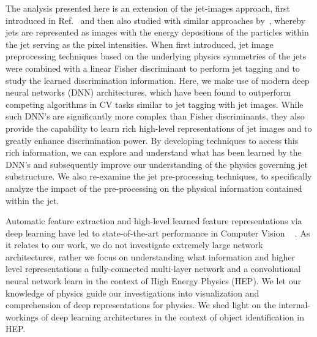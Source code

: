 \documentclass{article}
\begin{document}
The analysis presented here is an extension of the jet-images approach, first introduced in Ref.~\cite{Cogan:2014oua} and then also studied with similar approaches by~\cite{Almeida:2015jua}, whereby jets are represented as images with the energy depositions of the particles within the jet serving as the pixel intensities.  When first introduced, jet image preprocessing techniques based on the underlying physics symmetries of the jets were combined with a linear Fisher discriminant to perform jet tagging and to study the learned discrimination information.  Here, we make use of modern deep neural networks (DNN) architectures, which have been found to outperform competing algorithms in CV tasks similar to jet tagging with jet images.  While such DNN's are significantly more complex than Fisher discriminants, they also provide the capability to learn rich high-level representations of jet images and to greatly enhance discrimination power.  By developing techniques to access this rich information, we can explore and understand what has been learned by the DNN's and subsequently improve our understanding of the physics governing jet substructure.  We also re-examine the jet pre-processing techniques, to specifically analyze the impact of the pre-processing on the physical information contained within the jet.

%

Automatic feature extraction and high-level learned feature representations via deep learning have led to state-of-the-art performance in Computer Vision ~\cite{vggnet} \cite{maxout:goodfellow} \cite{dropout:and:LRN}. As it relates to our work, we do not investigate extremely large network architectures, rather we focus on  understanding what information and higher level representations a fully-connected multi-layer network and a convolutional neural network learn in the context of High Energy Physics (HEP). We let our knowledge of physics guide our investigations into visualization and comprehension of deep representations for physics. We shed light on the internal-workings of deep learning architectures in the context of object identification in HEP.
\end{document}
